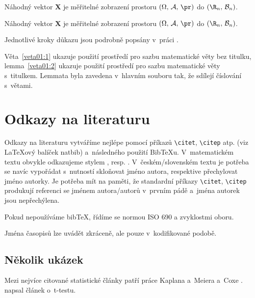 \begin{veta}\label{veta01:1}
  Náhodný vektor $\bm X$ je měřitelné zobrazení prostoru
  $(\Omega,\,\mathcal{A},\,\pr)$ do $(\R_n,\,\mathcal{B}_n)$.
\end{veta}

\begin{lemma}\label{veta01:2}
  Náhodný vektor $\bm X$ je měřitelné zobrazení prostoru
  $(\Omega,\,\mathcal{A},\,\pr)$ do $(\R_n,\,\mathcal{B}_n)$.
\end{lemma}
\begin{dukaz}
  Jednotlivé kroky důkazu jsou podrobně popsány v~práci \citet[str.
  29]{Andel07}.
\end{dukaz}
Věta~\ref{veta01:1} ukazuje použití prostředí pro sazbu matematické
věty bez titulku, lemma~\ref{veta01:2} ukazuje použití prostředí pro
sazbu matematické věty s~titulkem. Lemmata byla zavedena v~hlavním
souboru tak, že sdílejí číslování s~větami.






\chapter{Odkazy na literaturu}

Odkazy na literaturu vytváříme nejlépe pomocí příkazů
\verb|\citet|, \verb|\citep| atp.
(viz {\LaTeX}ový balíček \textsf{natbib}) a~následného použití
Bib{\TeX}u. V~matematickém textu obvykle odkazujeme stylem , resp. . V~českém/slovenském textu je potřeba se navíc vypořádat
s~nutností skloňovat jméno autora, respektive přechylovat jméno
autorky. Je potřeba mít na paměti, že standardní příkazy
\verb|\citet|, \verb|\citep|
produkují referenci se jménem autora/autorů v~prvním pádě a~jména
autorek jsou nepřechýlena.

Pokud nepoužíváme bib\TeX{}, řídíme se normou ISO 690 a zvyklostmi
oboru.

Jména časopisů lze uvádět zkráceně, ale pouze v~kodifikované podobě.

\section{Několik ukázek}

Mezi nejvíce citované statistické články patří práce Kaplana a~Meiera a~Coxe
\citep{KaplanMeier58, Cox72}. \citet{Student08} napsal článek o~t-testu.


